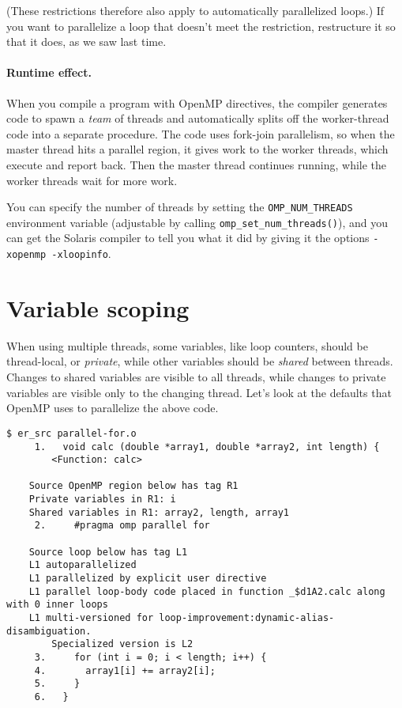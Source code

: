 \documentclass[11pt]{article}
\begin{document}
(These restrictions therefore also apply to automatically parallelized
loops.) If you want to parallelize a loop that doesn't meet the 
restriction, restructure it so that it does, as we saw last time.

\paragraph{Runtime effect.} When you compile a program with 
OpenMP directives, the compiler generates code to spawn a \emph{team}
of threads and automatically splits off the worker-thread code into a
separate procedure. The code uses fork-join parallelism, so when the
master thread hits a parallel region, it gives work to the worker
threads, which execute and report back. Then the master thread
continues running, while the worker threads wait for more work.

You can specify the number of threads by setting the
\verb+OMP_NUM_THREADS+ environment variable (adjustable by calling 
\verb+omp_set_num_threads()+), and you can get the
Solaris compiler to tell you what it did by giving it the
options \verb+-xopenmp -xloopinfo+.

\section*{Variable scoping}
When using multiple threads, some variables, like loop counters,
should be thread-local, or \emph{private}, while other variables
should be \emph{shared} between threads. Changes to shared variables
are visible to all threads, while changes to private variables are
visible only to the changing thread. Let's look at the defaults that
OpenMP uses to parallelize the above code.

{\scriptsize 
\begin{verbatim}
$ er_src parallel-for.o
     1.   void calc (double *array1, double *array2, int length) {
        <Function: calc>
    
    Source OpenMP region below has tag R1
    Private variables in R1: i
    Shared variables in R1: array2, length, array1
     2.     #pragma omp parallel for
    
    Source loop below has tag L1
    L1 autoparallelized
    L1 parallelized by explicit user directive
    L1 parallel loop-body code placed in function _$d1A2.calc along with 0 inner loops
    L1 multi-versioned for loop-improvement:dynamic-alias-disambiguation. 
        Specialized version is L2
     3.     for (int i = 0; i < length; i++) {
     4.       array1[i] += array2[i];
     5.     }
     6.   }
\end{verbatim}
}
\end{document}
